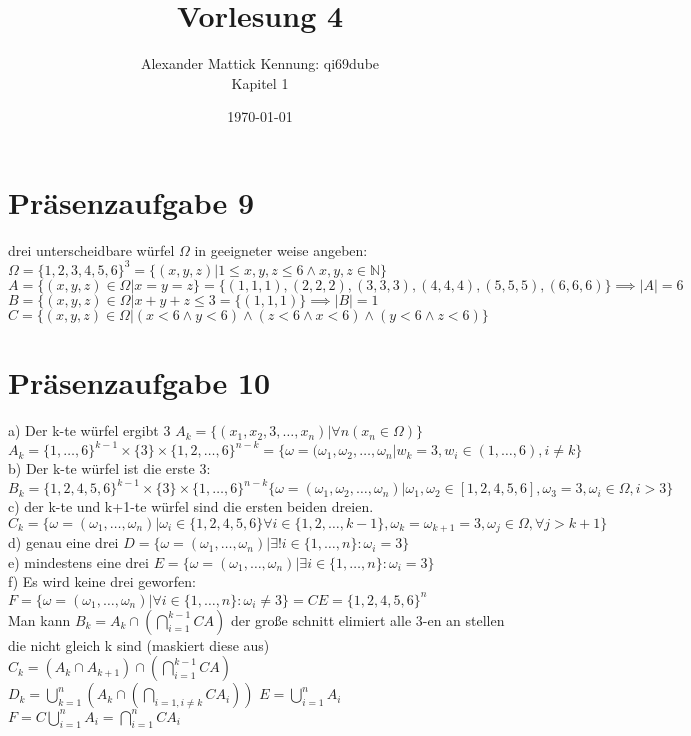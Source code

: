 \documentclass{article}
\author{
Alexander Mattick Kennung: qi69dube\\
Kapitel 1
}
\date{\today}
\title{Vorlesung 4}
\begin{document}
	\maketitle
	\section{Präsenzaufgabe 9}
	drei unterscheidbare würfel $\Omega$ in geeigneter weise angeben:\\
	$\Omega = \{1,2,3,4,5,6\}^3 = \{(x,y,z)|1\leq x,y,z\leq 6 \land x,y,z\in\mathbb{N}\}$\\
	$A = \{(x,y,z)\in\Omega|x=y=z\}=\{(1,1,1),(2,2,2),(3,3,3),(4,4,4),(5,5,5),(6,6,6)\} \implies |A| = 6$\\
	$B = \{(x,y,z)\in\Omega|x+y+z\leq 3 = \{(1,1,1)\} \implies |B|=1$
	$C =\{(x,y,z)\in\Omega|(x<6\land y<6)\land (z< 6\land x<6)\land(y<6\land z<6)\}$\\
	\section{Präsenzaufgabe 10}
	a) Der k-te würfel ergibt 3 $A_k = \{(x_1,x_2,3,\dots,x_n)|\forall n(x_n\in\Omega)\}$\\
	$A_k = \{1,\dots,6\}^{k-1}\times \{3\}\times\{1,2,\dots, 6\}^{n-k} =\{\omega =(\omega_1,\omega_2,\dots,\omega_n|w_k = 3, w_i \in(1,\dots,6), i\neq k\}$\\
	b) Der k-te würfel ist die erste 3:\\
	$B_k =\{1,2,4,5,6\}^{k-1}\times \{3\}\times \{1,\dots,6\}^{n-k} \{\omega=(\omega_1,\omega_2,\dots,\omega_n)|\omega_1,\omega_2\in[1,2,4,5,6],\omega_3=3,\omega_i\in\Omega,i>3\}$\\
	c) der k-te und k+1-te würfel sind die ersten beiden dreien.\\
	$C_k = \{\omega=(\omega_1,\dots,\omega_n)|\omega_i\in\{1,2,4,5,6\}\forall i\in\{1,2,\dots,k-1\},\omega_k =\omega_{k+1}=3, \omega_j\in\Omega,\forall j>k+1 \}$\\
	d) genau eine drei $D = \{\omega = (\omega_1,\dots,\omega_n)|\exists! i\in\{1,\dots,n\}: \omega_i=3\}$\\
	e) mindestens eine drei $E=\{\omega=(\omega_1,\dots,\omega_n)|\exists i\in\{1,\dots,n\}:\omega_i=3\}$\\
	f) Es wird keine drei geworfen:\\
	$F = \{\omega=(\omega_1,\dots,\omega_n)|\forall i\in\{1,\dots,n\}:\omega_i\neq 3\}=CE = \{1,2,4,5,6\}^n$\\
	Man kann $B_k=A_k\cap (\bigcap\limits^{k-1}_{i=1}CA)$ der große schnitt elimiert alle 3-en an stellen die nicht gleich k sind (maskiert diese aus)\\
	$C_k = (A_k\cap A_{k+1})\cap(\bigcap\limits^{k-1}_{i=1}CA)$\\
	$D_k = \bigcup\limits^{n}_{k=1}(A_k\cap (\bigcap\limits_{i=1,i\neq k}CA_i))$
	$E = \bigcup\limits^{n}_{i=1}A_i$\\
	$F= C\bigcup\limits^{n}_{i=1}A_i = \bigcap\limits^{n}_{i=1} CA_i$\\
\end{document}
